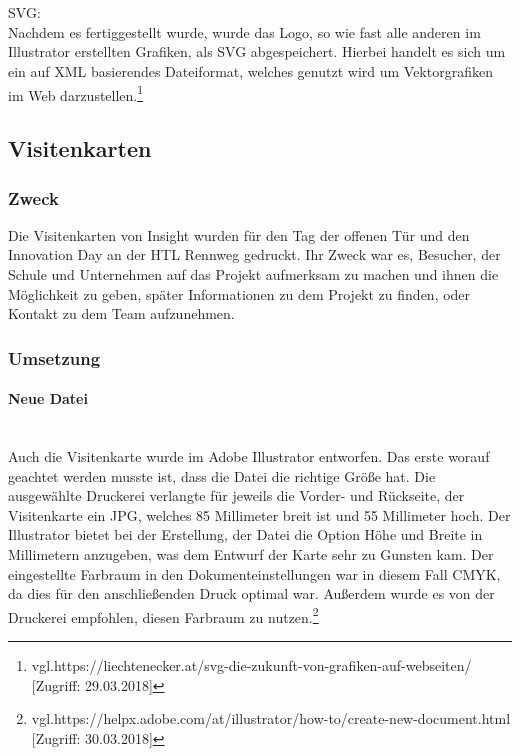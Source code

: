 \leavevmode \\
\leavevmode \\
SVG:
\leavevmode \\
Nachdem es fertiggestellt wurde, wurde das Logo, so wie fast alle anderen im Illustrator erstellten Grafiken, als SVG abgespeichert. Hierbei handelt es sich um ein auf XML basierendes Dateiformat, welches genutzt wird um Vektorgrafiken im Web darzustellen.\footnote{\label{} vgl.https://liechtenecker.at/svg-die-zukunft-von-grafiken-auf-webseiten/ [Zugriff: 29.03.2018]}

\subsection{Visitenkarten}
\subsubsection{Zweck}
Die Visitenkarten von Insight wurden für den Tag der offenen Tür und den Innovation Day an der HTL Rennweg gedruckt. Ihr Zweck war es, Besucher, der Schule und Unternehmen auf das Projekt aufmerksam zu machen und ihnen die Möglichkeit zu geben, später Informationen zu dem Projekt zu finden, oder Kontakt zu dem Team aufzunehmen.
\subsubsection{Umsetzung}

\paragraph{Neue Datei}
\leavevmode \\
Auch die Visitenkarte wurde im Adobe Illustrator entworfen. Das erste worauf geachtet werden musste ist, dass die Datei die richtige Größe hat. Die ausgewählte Druckerei verlangte für jeweils die Vorder- und Rückseite, der Visitenkarte ein JPG, welches 85 Millimeter breit ist und 55 Millimeter hoch. Der Illustrator bietet bei der Erstellung, der Datei die Option Höhe und Breite in Millimetern anzugeben, was dem Entwurf der Karte sehr zu Gunsten kam. Der eingestellte Farbraum in den Dokumenteinstellungen war in diesem Fall CMYK, da dies für den anschließenden Druck optimal war. Außerdem wurde es von der Druckerei empfohlen, diesen Farbraum zu nutzen.\footnote{\label{} vgl.https://helpx.adobe.com/at/illustrator/how-to/create-new-document.html [Zugriff: 30.03.2018]}

